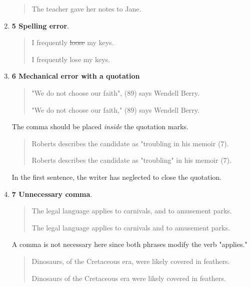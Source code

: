 \begin{enumerate}
\begin{quote}
The teacher gave her notes to Jane.  

\end{quote}

\item \textbf{5 Spelling error}.

\begin{quote}
I frequently \sout{loose} my keys. 

I frequently lose my keys. 

\end{quote}

\item \textbf{6 Mechanical error with a quotation}

\begin{quote}
"We do not choose our faith", (89) says Wendell Berry. 

"We do not choose our faith," (89) says Wendell Berry. 
\end{quote}

 The comma should be placed \emph{inside} the quotation marks.

\medskip

\begin{quote}
Roberts describes the candidate as "troubling in his memoir (7). 

Roberts describes the candidate as "troubling" in his memoir (7). 

\end{quote}

 In the first sentence, the writer has neglected to close the quotation.

\item \textbf{7 Unnecessary comma}.

\begin{quote}
The legal language applies to carnivals, and to amusement parks.   

The legal language applies to carnivals and to amusement parks.   
\end{quote}

 A comma is not necessary here since both phrases modify the verb "applies."

\medskip

\begin{quote}
Dinosaurs, of the Cretaceous era, were likely covered in feathers.   

Dinosaurs of the Cretaceous era were likely covered in feathers.   


\end{quote}
\end{enumerate}
